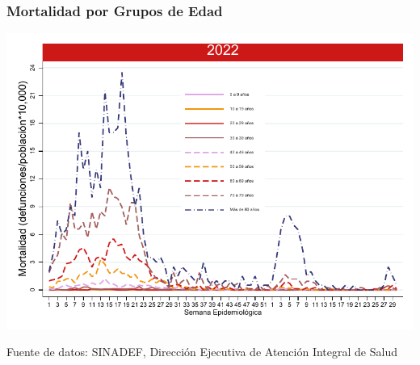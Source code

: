 \documentclass[xcolor=table]{beamer}
\begin{document}
	\begin{frame}
		\frametitle{Mortalidad por Grupos de Edad}
		\vspace{-.1cm}
		\begin{center}
			\includegraphics[width=0.9\linewidth]{../figuras/mortalidad_edad_2021_2022.pdf}
		\end{center}
		{\tiny Fuente de datos: SINADEF, Dirección Ejecutiva de Atención Integral de Salud} 
	\end{frame}
\end{document}

